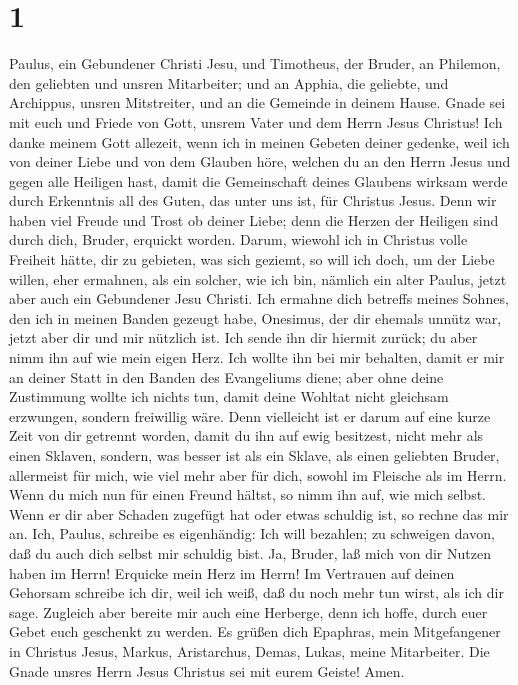 \hypertarget{section}{%
\section{1}\label{section}}

 Paulus, ein Gebundener Christi Jesu, und Timotheus, der
Bruder, an Philemon, den geliebten und unsren Mitarbeiter;
 und an Apphia, die geliebte, und Archippus, unsren
Mitstreiter, und an die Gemeinde in deinem Hause.  Gnade
sei mit euch und Friede von Gott, unsrem Vater und dem Herrn Jesus
Christus!  Ich danke meinem Gott allezeit, wenn ich in
meinen Gebeten deiner gedenke,  weil ich von deiner Liebe
und von dem Glauben höre, welchen du an den Herrn Jesus und gegen alle
Heiligen hast,  damit die Gemeinschaft deines Glaubens
wirksam werde durch Erkenntnis all des Guten, das unter uns ist, für
Christus Jesus.  Denn wir haben viel Freude und Trost ob
deiner Liebe; denn die Herzen der Heiligen sind durch dich, Bruder,
erquickt worden.  Darum, wiewohl ich in Christus volle
Freiheit hätte, dir zu gebieten, was sich geziemt,  so
will ich doch, um der Liebe willen, eher ermahnen, als ein solcher, wie
ich bin, nämlich ein alter Paulus, jetzt aber auch ein Gebundener Jesu
Christi.  Ich ermahne dich betreffs meines Sohnes, den
ich in meinen Banden gezeugt habe, Onesimus,  der dir
ehemals unnütz war, jetzt aber dir und mir nützlich ist. 
Ich sende ihn dir hiermit zurück; du aber nimm ihn auf wie mein eigen
Herz.  Ich wollte ihn bei mir behalten, damit er mir an
deiner Statt in den Banden des Evangeliums diene;  aber
ohne deine Zustimmung wollte ich nichts tun, damit deine Wohltat nicht
gleichsam erzwungen, sondern freiwillig wäre.  Denn
vielleicht ist er darum auf eine kurze Zeit von dir getrennt worden,
damit du ihn auf ewig besitzest,  nicht mehr als einen
Sklaven, sondern, was besser ist als ein Sklave, als einen geliebten
Bruder, allermeist für mich, wie viel mehr aber für dich, sowohl im
Fleische als im Herrn.  Wenn du mich nun für einen Freund
hältst, so nimm ihn auf, wie mich selbst.  Wenn er dir
aber Schaden zugefügt hat oder etwas schuldig ist, so rechne das mir an.
 Ich, Paulus, schreibe es eigenhändig: Ich will bezahlen;
zu schweigen davon, daß du auch dich selbst mir schuldig bist.
 Ja, Bruder, laß mich von dir Nutzen haben im Herrn!
Erquicke mein Herz im Herrn!  Im Vertrauen auf deinen
Gehorsam schreibe ich dir, weil ich weiß, daß du noch mehr tun wirst,
als ich dir sage.  Zugleich aber bereite mir auch eine
Herberge, denn ich hoffe, durch euer Gebet euch geschenkt zu werden.
 Es grüßen dich Epaphras, mein Mitgefangener in Christus
Jesus,  Markus, Aristarchus, Demas, Lukas, meine
Mitarbeiter.  Die Gnade unsres Herrn Jesus Christus sei
mit eurem Geiste! Amen.
